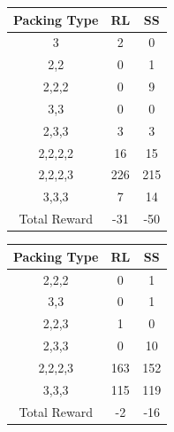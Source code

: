 \begin{table}[h!]
	\centering
	\begin{tabular}{ |c|c|c| } 
		\hline
		Packing Type & RL & SS \\ 
		\hline
		3 & 2 & 0 \\
		\hline
		2,2 & 0 & 1 \\
		\hline
		2,2,2 & 0 & 9 \\   
		\hline
		3,3 & 0 & 0 \\
		\hline
		2,3,3 & 3 & 3 \\
		\hline
		2,2,2,2 & 16 & 15 \\
		\hline
		2,2,2,3 & 226  & 215 \\
		\hline
		3,3,3 & 7 & 14 \\
		\hline
		Total Reward & -31 &-50 \\
		\hline
	\end{tabular}
\end{table}

\begin{table}[h!]
	\centering
	\begin{tabular}{ |c|c|c| } 
		\hline
		Packing Type & RL & SS \\ 
		\hline
		2,2,2 & 0 & 1 \\   
		\hline
		3,3 & 0 & 1 \\
		\hline
		2,2,3 & 1 & 0 \\
		\hline
		2,3,3 & 0 & 10 \\
		\hline
		2,2,2,3 & 163 & 152 \\
		\hline
		3,3,3 & 115 & 119 \\
		\hline
		Total Reward & -2 &-16 \\
		\hline
	\end{tabular}
\end{table}
\fi

